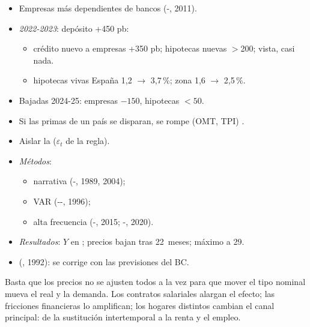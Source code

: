 \documentclass{article}
\begin{document}
\begin{columnas}
\begin{itemize}
\item Empresas más dependientes de bancos (-, 2011).
\item \emph{2022-2023}: depósito +450 pb:
  \begin{itemize}
  \item crédito nuevo a empresas +350 pb; hipotecas nuevas $>$200; vista, casi nada.
  \item hipotecas vivas España 1,2 $\to$ 3,7\,\%; zona 1,6 $\to$ 2,5\,\%.
  \end{itemize}
\item Bajadas 2024-25: empresas $-150$, hipotecas $<50$.
\item Si las primas de un país se disparan, se rompe (OMT, TPI) .
\end{itemize}

\begin{itemize}
\item Aislar la  ($\varepsilon_t$ de la regla).
\item \emph{Métodos}:
  \begin{itemize}
  \item narrativa (-, 1989, 2004);
  \item VAR (--, 1996);
  \item alta frecuencia (-, 2015; -, 2020).
  \end{itemize}
\item \emph{Resultados}: $Y$ en ; precios bajan tras 22~meses; máximo a 29.
\item {} (, 1992): se corrige con las previsiones del BC.
\end{itemize}

\begin{ideaclave}
Basta que los precios no se ajusten todos a la vez para que mover el tipo nominal mueva el real y la demanda. Los contratos salariales alargan el efecto; las fricciones financieras lo amplifican; los hogares distintos cambian el canal principal: de la sustitución intertemporal a la renta y el empleo.
\end{ideaclave}


\end{columnas}
\end{document}
